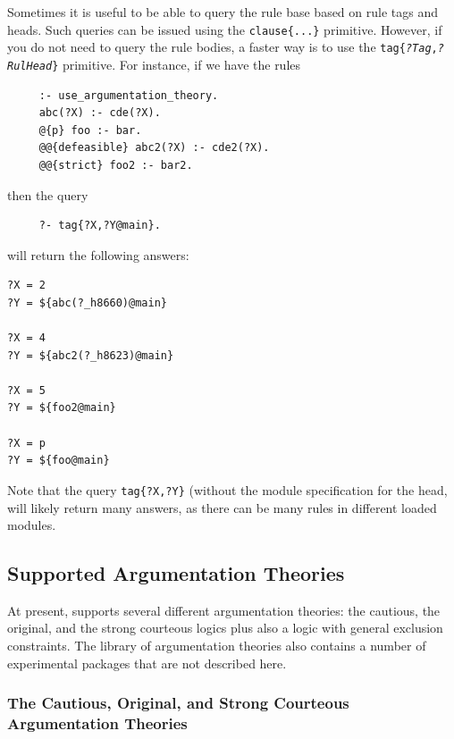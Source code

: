 \documentclass[11pt]{article}
\newcommand{\ERGO}{\mbox{\smaller{\ensuremath{\cal{E}}\smaller{{\sc{RGO}}}}}\xspace}
\newcommand{\FLSYSTEM}{\ERGO}
\begin{document}
Sometimes it is useful to be able to query the rule base based on rule
tags and heads. Such queries can be issued
using the {\tt clause\{...\}} primitive. However, 
if you do not need to query the rule bodies, a faster way is to use the
{\tt tag\{{\it?Tag},{\it ?RulHead}\}}  primitive. For instance, if we have
the rules
\begin{verbatim}
     :- use_argumentation_theory.
     abc(?X) :- cde(?X).
     @{p} foo :- bar.
     @@{defeasible} abc2(?X) :- cde2(?X).
     @@{strict} foo2 :- bar2.
\end{verbatim}
then the query
\begin{verbatim}
     ?- tag{?X,?Y@main}.
\end{verbatim}
will return the following answers:
\begin{verbatim}
?X = 2
?Y = ${abc(?_h8660)@main}

?X = 4
?Y = ${abc2(?_h8623)@main}

?X = 5
?Y = ${foo2@main}

?X = p
?Y = ${foo@main}
\end{verbatim}
Note that the query \texttt{tag\{?X,?Y\}} (without the module specification
for the head, will likely return many answers, as there can be many rules
in different loaded modules. 


\subsection{Supported Argumentation Theories}\label{sec-exclusion-constr}

At present, \FLSYSTEM supports several different argumentation theories: the
cautious,
the original, and the strong courteous logics plus also a
logic with general exclusion constraints. The \FLSYSTEM library of
argumentation theories also contains a number of
experimental packages that are not described here.

\subsubsection{The Cautious, Original, and Strong Courteous Argumentation Theories}
\end{document}
